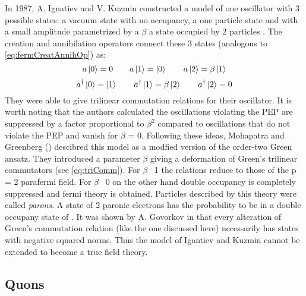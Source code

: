 In 1987, A. Ignatiev and V. Kuzmin constructed a model of one oscillator with 3 possible states: a vacuum state with no occupancy, a one particle state and with a small amplitude parametrized by a  $\beta$ a state occupied by 2 particles \cite{Ignatiev1987}. The creation and annihilation operators connect these 3 states (analogous to \ref{eq:fermCreatAnnihOp}) as:
\begin{equation}
 a \ket{0} = 0 \hspace{2em} a \ket{1} = \ket{0} \hspace{2em}  a \ket{2} = \beta \ket{1}
\end{equation} 
\begin{equation}
 a^{\dag} \ket{0} = \ket{1} \hspace{2em}  a^{\dag} \ket{1} = \beta \ket{2} \hspace{2em}  a^{\dag} \ket{2} = 0
\end{equation} 
They were able to give trilinear commutation relations for their oscillator. It is worth noting that the authors calculated the oscillations violating the PEP are suppressed by a factor proportional to $\beta^{2}$ compared to oscillations that do not violate the PEP and vanish for $\beta$ = 0. Following these ideas, Mohapatra and Greenberg (\cite{Greenberg2000}) descibred this model as a modfied version of the order-two Green ansatz. They introduced a parameter $\beta$ giving a deformation of Green's trilinear commutators (see \ref{eq:triComm}). For $\beta$ \textrightarrow \ 1 the relations reduce to those of the p = 2 parafermi field. For $\beta$ \textrightarrow \ 0 on the other hand double occupancy is completely suppressed and fermi theory is obtained. Particles described by this theory were called \textit{parons}. A state of 2 paronic electrons has the probability to be in a double occupany state of \betatwo. It was shown by A. Govorkov in \cite{Govorkov1989} that every alteration of Green's commutation relation (like the one discussed here) necessarily has states with negative squared norms. Thus the model of Igantiev and Kuzmin cannot be extended to become a true field theory.

\subsection{Quons}

